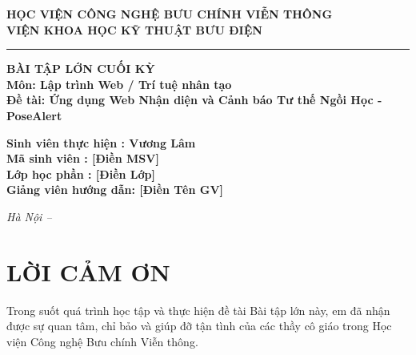 \documentclass[12pt,a4paper]{report}
\begin{document}
\begin{titlepage}
    \begin{center}
        \textbf{\large HỌC VIỆN CÔNG NGHỆ BƯU CHÍNH VIỄN THÔNG}\\
        \textbf{\large VIỆN KHOA HỌC KỸ THUẬT BƯU ĐIỆN}\\
        \vspace{1.5cm}
        \rule{4cm}{4cm} %
        
        \vspace{1.5cm}
        \textbf{\large BÀI TẬP LỚN CUỐI KỲ}\\
        \textbf{\large Môn: Lập trình Web / Trí tuệ nhân tạo}\\
        \vspace{1cm}
        \textbf{\huge Đề tài: Ứng dụng Web Nhận diện và Cảnh báo Tư thế Ngồi Học - PoseAlert}\\
        
        \vspace{3cm}
        \begin{flushleft}
            \hspace{3cm}\textbf{Sinh viên thực hiện \hspace{0.5cm}: Vương Lâm}\\
            \hspace{3cm}\textbf{Mã sinh viên \hspace{1.3cm}: [Điền MSV]}\\
            \hspace{3cm}\textbf{Lớp học phần \hspace{1.2cm}: [Điền Lớp]}\\
            \hspace{3cm}\textbf{Giảng viên hướng dẫn: [Điền Tên GV]}\\
        \end{flushleft}
        
        \vfill
        \textit{Hà Nội – \the\year}
    \end{center}
\end{titlepage}

\newpage
\chapter*{LỜI CẢM ƠN}
Trong suốt quá trình học tập và thực hiện đề tài Bài tập lớn này, em đã nhận được sự quan tâm, chỉ bảo và giúp đỡ tận tình của các thầy cô giáo trong Học viện Công nghệ Bưu chính Viễn thông. 
\end{document}
